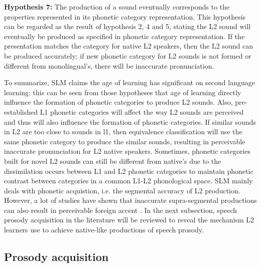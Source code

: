 \textbf{Hypothesis 7:} The production of a sound eventually corresponds to the properties represented in its phonetic category representation. This hypothesis can be regarded as the result of hypothesis 2, 4 and 5, stating the L2 sound will eventually be produced as specified in phonetic category representation. If the presentation matches the category for native L2 speakers, then the L2 sound can be produced accurately; if new phonetic category for L2 sounds is not formed or different from monolingual's, there will be inaccurate pronunciation.

To summarize, SLM claims the age of learning has significant on second language learning: this can be seen from those hypotheses that age of learning directly influence the formation of phonetic categories to produce L2 sounds. Also, pre-established L1 phonetic categories will affect the way L2 sounds are perceived  and thus will also influence the formation of phonetic categories. If similar sounds in L2 are too close to sounds in l1, then equivalence classification will use the same phonetic category to produce the similar sounds, resulting in perceivable inaccurate pronunciation for L2 native speakers. Sometimes, phonetic categories built for novel L2 sounds can still be different from native's due to the dissimilation occurs between L1 and L2 phonetic categories to maintain phonetic contrast between categories in a common L1-L2 phonological space. SLM mainly deals with phonetic acquistion, i.e. the segmental accuracy of L2 production. However, a lot of studies have shown that inaccurate supra-segmental productions can also result in perceivable foreign accent \citep{rognoni2013testing,winters2013perceived}. In the next subsection, speech prosody acquisition in the literature will be reviewed to reveal the mechanism L2 learners use to achieve native-like productions of speech prosody.



\subsection{Prosody acquisition}

